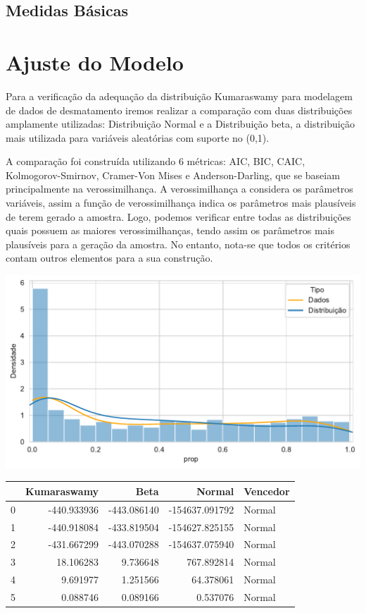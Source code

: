 \documentclass[
]{article}
\begin{document}
\subsection{Medidas Básicas}

\section{\centering Ajuste do Modelo}

Para a verificação da adequação da distribuição Kumaraswamy para
modelagem de dados de desmatamento iremos realizar a comparação com duas
distribuições amplamente utilizadas: Distribuição Normal e a
Distribuição beta, a distribuição mais utilizada para variáveis
aleatórias com suporte no (0,1).

A comparação foi construída utilizando 6 métricas: AIC, BIC, CAIC,
Kolmogorov-Smirnov, Cramer-Von Mises e Anderson-Darling, que se baseiam
principalmente na verossimilhança. A verossimilhança a considera os
parâmetros variáveis, assim a função de verossimilhança indica os
parâmetros mais plausíveis de terem gerado a amostra. Logo, podemos
verificar entre todas as distribuições quais possuem as maiores
verossimilhanças, tendo assim os parâmetros mais plausíveis para a
geração da amostra. No entanto, nota-se que todos os critérios contam
outros elementos para a sua construção.

\includegraphics{report_files/figure-pdf/cell-6-output-1.pdf}

\begin{tabular}{lrrrl}
\toprule
{} &  Kumaraswamy &        Beta &         Normal & Vencedor \\
\midrule
0 &  -440.933936 & -443.086140 & -154637.091792 &   Normal \\
1 &  -440.918084 & -433.819504 & -154627.825155 &   Normal \\
2 &  -431.667299 & -443.070288 & -154637.075940 &   Normal \\
3 &    18.106283 &    9.736648 &     767.892814 &   Normal \\
4 &     9.691977 &    1.251566 &      64.378061 &   Normal \\
5 &     0.088746 &    0.089166 &       0.537076 &   Normal \\
\bottomrule
\end{tabular}
\end{document}

